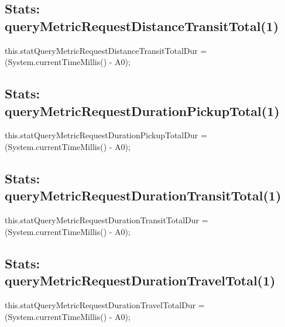 \subsection{Stats: queryMetricRequestDistanceTransitTotal(1)}
\nwenddocs{}\endmoddef{}
this.statQueryMetricRequestDistanceTransitTotalDur = (System.currentTimeMillis() - A0);
\nwendcode{}\nwdocspar

\subsection{Stats: queryMetricRequestDurationPickupTotal(1)}
\nwenddocs{}\endmoddef{}
this.statQueryMetricRequestDurationPickupTotalDur = (System.currentTimeMillis() - A0);
\nwendcode{}\nwdocspar

\subsection{Stats: queryMetricRequestDurationTransitTotal(1)}
\nwenddocs{}\endmoddef{}
this.statQueryMetricRequestDurationTransitTotalDur = (System.currentTimeMillis() - A0);
\nwendcode{}\nwdocspar

\subsection{Stats: queryMetricRequestDurationTravelTotal(1)}
\nwenddocs{}\endmoddef{}
this.statQueryMetricRequestDurationTravelTotalDur = (System.currentTimeMillis() - A0);
\nwendcode{}\nwdocspar

